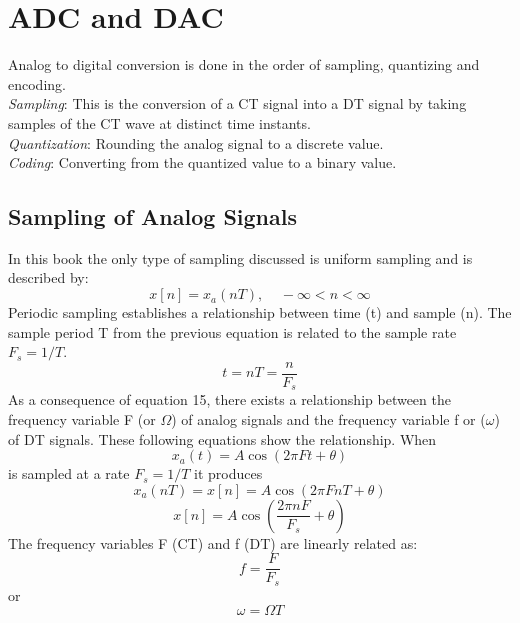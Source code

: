 \documentclass{article} %
\begin{document}
	\section{ADC and DAC}
    Analog to digital conversion is done in the order of sampling, quantizing and encoding.\\
    \textit{Sampling}: This is the conversion of a CT signal into a DT signal by taking samples of the CT wave at distinct time instants.\\
    \textit{Quantization}: Rounding the analog signal to a discrete value. \\
    \textit{Coding}: Converting from the quantized value to a binary value.\\
    
    \subsection{Sampling of Analog Signals}
    In this book the only type of sampling discussed is uniform sampling and is described by:
    \begin{equation}  
	x[n] = x_a(nT), \;\;\;\; -\infty < n < \infty
    \end{equation}
    Periodic sampling establishes a relationship between time (t) and sample (n). The sample period T from the previous equation is related to the sample rate $F_s = 1/T$. 
    \begin{equation}  
	t = nT = \frac{n}{F_s}
    \end{equation}
    As a consequence of equation 15, there exists a relationship between the frequency variable F (or $\Omega$) of analog signals and the frequency variable f or ($\omega$) of DT signals. These following equations show the relationship. When
    \begin{equation}  
	x_a(t) = A \cos(2 \pi Ft + \theta)
    \end{equation}
    is sampled at a rate $F_s = 1/T$ it produces
    \begin{equation}  
	x_a(nT) = x[n] = A \cos(2 \pi FnT + \theta)
    \end{equation}
    \begin{equation}  
	x[n] = A \cos(\frac{2 \pi nF}{F_s} + \theta)
    \end{equation}
    The frequency variables F (CT) and f (DT) are linearly related as:
    \begin{equation}  
	f = \frac{F}{F_s}
    \end{equation}
    or 
    \begin{equation}  
	\omega = \Omega T
    \end{equation}
\end{document}
